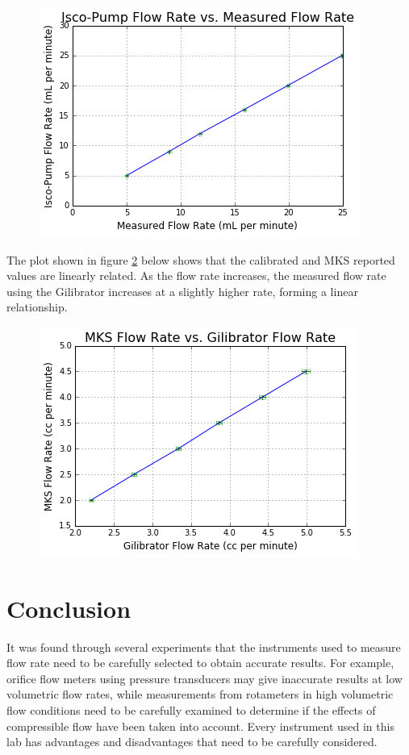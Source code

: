 \documentclass[paper=letter, fontsize=10pt]{scrartcl} %
\begin{document}
\begin{figure}[!h]
  \label{plot:exp2}
  \includegraphics[scale=0.6]{Lab1FigureScale}
  \centering
\end{figure}

The plot shown in figure \ref{plot:exp3} below shows that the calibrated and MKS reported values are linearly related.  As the flow rate increases, the measured flow rate using the Gilibrator increases at a slightly higher rate, forming a linear relationship.

\begin{figure}
  \label{plot:exp3}
  \includegraphics[scale=0.6]{Lab1FigureGili}
  \centering
\end{figure}

\section{Conclusion}
It was found through several experiments that the instruments used to measure flow rate need to be carefully selected to obtain accurate results.  For example, orifice flow meters using pressure transducers may give inaccurate results at low volumetric flow rates, while measurements from rotameters in high volumetric flow conditions need to be carefully examined to determine if the effects of compressible flow have been taken into account.  Every instrument used in this lab has advantages and disadvantages that need to be carefully considered.
\end{document}
